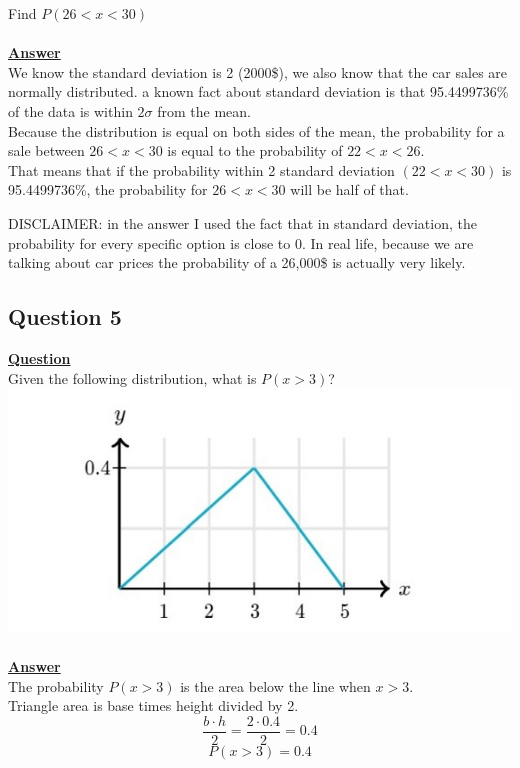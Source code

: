 \documentclass[a4, 12pt,titlepage]{scrartcl}
\begin{document}
 Find $P(26<x<30)$\\
 \smallskip\\
 \textbf{\underline{Answer}}\\
We know the standard deviation is 2 (2000\$), we also know that the car sales are normally distributed. a known fact about standard deviation is that 95.4499736\% of the data is within $2\sigma$ from the mean.\\
Because the distribution is equal on both sides of the mean, the probability for a sale between $26<x<30$ is equal to the probability of $22<x<26$.\\
That means that if the probability within 2 standard deviation $(22<x<30)$ is 95.4499736\%, the probability for $26<x<30$ will be half of that.\\
\begin{center}
\end{center}
DISCLAIMER: in the answer I used the fact that in standard deviation, the probability for every specific option is close to 0.
In real life, because we are talking about car prices the probability of a 26,000\$ is actually very likely.
\newpage

\subsection{Question 5}
\textbf{\underline{Question}}\\
Given the following distribution, what is $P(x>3)$?\\
\includegraphics{DSgraph1.jpg}\\
\smallskip\\
\textbf{\underline{Answer}}\\
The probability $P(x>3)$ is the area below the line when $x>3$.\\
Triangle area is base times height divided by 2.\[
\frac{b\cdot h}{2}=\frac{2\cdot 0.4}{2}=0.4
\]
\[
\boxed{P(x>3)=0.4}
\]
 \newpage
\end{document}
